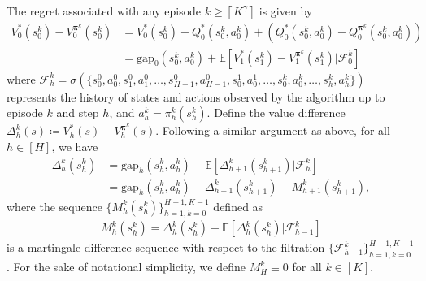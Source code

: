 \documentclass[11pt]{article}
\newcommand{\pii}{\boldsymbol{\pi}}
\newcommand{\E} {\mathbb{E}}
\newcommand{\Dvs}{\Delta}
\newcommand{\Dvsm}{M}
\newcommand{\ceil}[1]{\left\lceil #1\right\rceil}
\newcommand{\gap}{\mathrm{gap}}
\begin{document}
The regret associated with any episode $k\geq\ceil{K^\gamma}$ is given by
\begin{align*}
    V_0^{*}(s_0^k) - V_0^{\pii^k}(s_0^k) &= V_0^{*}(s_0^k) - Q_0^{*}(s_0^k,a_0^k) + (Q_0^{*}(s_0^k,a_0^k) - Q_0^{\pii^k}(s_0^k,a_0^k))\\
    &= \gap_0(s_0^k,a_0^k) + \E\left[V_1^{*}(s_1^k) - V_1^{\pii^k}(s_1^k)\big| \mathcal{F}_0^{k} \right]
\end{align*}
where $\mathcal{F}_h^k = \sigma(\{s_0^0, a_0^0, s_1^0, a_1^0, \ldots, s_{H-1}^0, a_{H-1}^0, s_0^1, a_0^1, \ldots, s_0^k, a_0^k, \ldots, s_{h}^k, a_{h}^k\})$ represents the history of states and actions observed by the algorithm up to episode $k$ and step $h$, and $a_h^k = \pi_h^k(s_h^k)$. Define the value difference $\Dvs_h^k(s) \coloneqq V_h^{*}(s) - V_h^{\pii^k}(s)$. Following a similar argument as above, for all $h\in [H]$, we have
\begin{align*}
    \Dvs^k_h(s_h^k) &= \gap_h(s_h^k,a_h^k)+ \E\left[\Dvs^k_{h+1}(s_{h+1}^k)\big| \mathcal{F}_h^{k} \right]\\
    &= \gap_h(s_h^k,a_h^k) + \Dvs^k_{h+1}(s_{h+1}^k) - \Dvsm^k_{h+1}(s_{h+1}^k),
\end{align*}
where the sequence $\{\Dvsm^k_{h}(s_{h}^k)\}_{h=1,k=0}^{H-1,K-1}$ defined as 
\begin{align*}
    \Dvsm^k_{h}(s_{h}^k) = \Dvs^k_{h}(s_{h}^k) - \E\left[\Dvs^k_{h}(s_{h}^k)\big| \mathcal{F}_{h-1}^{k} \right]
\end{align*}
is a martingale difference sequence with respect to the filtration $\{\mathcal{F}_{h-1}^{k}\}_{h=1,k=0}^{H-1,K-1}$. For the sake of notational simplicity, we define $\Dvsm^k_{H}\equiv 0$ for all $k\in[K]$.
\end{document}

